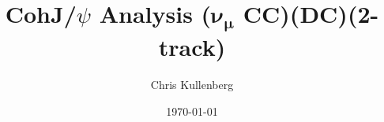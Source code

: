 \title{CohJ/$\psi$ Analysis ($\boldsymbol{\nu_\mu}$ \textbf{CC})(\textbf{DC})(\textbf{2-track})}
\author{Chris Kullenberg}
\date{\today}
